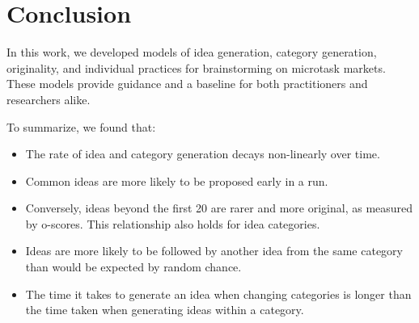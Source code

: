 



\section{Conclusion}

In this work, we developed models of idea generation, category generation, originality, and individual practices for brainstorming on microtask markets. These models provide guidance and a baseline for both practitioners and researchers alike.

To summarize, we found that:

\begin{itemize}
\item The rate of idea and category generation decays non-linearly over time. 
\item Common ideas are more likely to be proposed early in a run. 
\item Conversely, ideas beyond the first 20 are rarer and more original, as measured by o-scores. This relationship also holds for idea categories.
\item Ideas are more likely to be followed by another idea from the same category than would be expected by random chance.
\item The time it takes to generate an idea when changing categories is longer than the time taken when generating ideas within a category.
\end{itemize}

